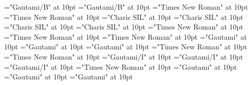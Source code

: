 \documentclass[c5paper,twoside]{article}
\begin{document}
\font\headwordggoTeluINentryletDatadicBody="Gautami/B" at 10pt
\font\headwordafterentryletDatadicBody="Gautami/B" at 10pt
\font\pronunciationsentryletDatadicBody="Times New Roman" at 10pt
\font\pronunciationsafterentryletDatadicBody="Times New Roman" at 10pt
\font\pronunciationggofonipaxemicpronunciationsentryletDatadicBody="Charis SIL" at 10pt
\font\pronunciationbeforepronunciationsentryletDatadicBody="Charis SIL" at 10pt
\font\pronunciationafterpronunciationsentryletDatadicBody="Charis SIL" at 10pt
\font\spanggofonipaxemicpronunciationggofonipaxemicpronunciationsentryletDatadicBody="Charis SIL" at 10pt
\font\sensesentryletDatadicBody="Times New Roman" at 10pt
\font\sensesafterentryletDatadicBody="Times New Roman" at 10pt
\font\sensesensesentryletDatadicBody="Times New Roman" at 10pt
\font\LexSensepublishStemGlossPubLdtesensesensesentryletDatadicBody="Gautami" at 10pt
\font\LexSensepublishStemGlossPubLdaftersensesensesentryletDatadicBody="Gautami" at 10pt
\font\spanteLexSensepublishStemGlossPubLdtesensesensesentryletDatadicBody="Gautami" at 10pt
\font\examplessensesensesentryletDatadicBody="Times New Roman" at 10pt
\font\examplesaftersensesensesentryletDatadicBody="Times New Roman" at 10pt
\font\exampleggoTeluINexamplessensesensesentryletDatadicBody="Gautami/I" at 10pt
\font\exampleafterexamplessensesensesentryletDatadicBody="Gautami/I" at 10pt
\font\spanggoTeluINexampleggoTeluINexamplessensesensesentryletDatadicBody="Gautami/I" at 10pt
\font\translationsexamplessensesensesentryletDatadicBody="Times New Roman" at 10pt
\font\translationLdtetranslationsexamplessensesensesentryletDatadicBody="Gautami" at 10pt
\font\translationLdaftertranslationsexamplessensesensesentryletDatadicBody="Gautami" at 10pt
\font\spantetranslationLdtetranslationsexamplessensesensesentryletDatadicBody="Gautami" at 10pt
\end{document}
